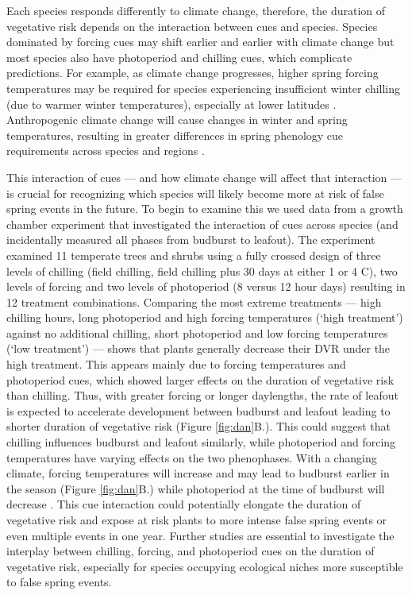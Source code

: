 \documentclass{article}\usepackage[]{graphicx}\usepackage[]{color}
\begin{document}
Each species responds differently to climate change, therefore, the duration of vegetative risk depends on the interaction between cues and species. Species dominated by forcing cues may shift earlier and earlier with climate change but most species also have photoperiod and chilling cues, which complicate predictions. For example, as climate change progresses, higher spring forcing temperatures may be required for species experiencing insufficient winter chilling (due to warmer winter temperatures), especially at lower latitudes \citep{McCreary1990, Morin2009, Fu2012, Polgar2014, Chuine2010}. Anthropogenic climate change will cause changes in winter and spring temperatures, resulting in greater differences in spring phenology cue requirements across species and regions \citep{Menzel2006}. 

This interaction of cues --- and how climate change will affect that interaction --- is crucial for recognizing which species will likely become more at risk of false spring events in the future. To begin to examine this we used data from a growth chamber experiment that investigated the interaction of cues across species (and incidentally measured all phases from budburst to leafout). The experiment examined 11 temperate trees and shrubs using a fully crossed design of three levels of chilling (field chilling, field chilling plus 30 days at either 1 or 4 C), two levels of forcing and two levels of photoperiod (8 versus 12 hour days) resulting in 12 treatment combinations. Comparing the most extreme treatments --- high chilling hours, long photoperiod and high forcing temperatures (`high treatment') against no additional chilling, short photoperiod and low forcing temperatures (`low treatment') --- shows that plants generally decrease their DVR under the high treatment. This appears mainly due to forcing temperatures and photoperiod cues, which showed larger effects on the duration of vegetative risk than chilling. Thus, with greater forcing or longer daylengths, the rate of leafout is expected to accelerate development between budburst and leafout leading to shorter duration of vegetative risk (Figure \ref{fig:dan}B.). This could suggest that chilling influences budburst and leafout similarly, while photoperiod and forcing temperatures have varying effects on the two phenophases. With a changing climate, forcing temperatures will increase and may lead to budburst earlier in the season (Figure \ref{fig:dan}B.) while photoperiod at the time of budburst will decrease \citep{Basler2014}. This cue interaction could potentially elongate the duration of vegetative risk and expose at risk plants to more intense false spring events or even multiple events in one year. Further studies are essential to investigate the interplay between chilling, forcing, and photoperiod cues on the duration of vegetative risk, especially for species occupying ecological niches more susceptible to false spring events. 
\end{document}
